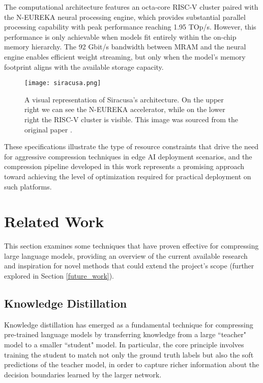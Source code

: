 The computational architecture features an octa-core RISC-V cluster paired with the N-EUREKA neural processing engine, which provides substantial parallel processing capability with peak performance reaching 1.95 TOp/s. However, this performance is only achievable when models fit entirely within the on-chip memory hierarchy. The 92 Gbit/s bandwidth between MRAM and the neural engine enables efficient weight streaming, but only when the model's memory footprint aligns with the available storage capacity.

\begin{figure}[htbp]
    \centering
    \texttt{[image: siracusa.png]}
    \caption[The architecture of Siracusa]{A visual representation of Siracusa's architecture. On the upper right we can see the N-EUREKA accelerator, while on the lower right the RISC-V cluster is visible. This image was sourced from the original paper \cite{target_hardware}.}
    \label{fig:siracusa}
\end{figure}

These specifications illustrate the type of resource constraints that drive the need for aggressive compression techniques in edge AI deployment scenarios, and the compression pipeline developed in this work represents a promising approach toward achieving the level of optimization required for practical deployment on such platforms.
\section{Related Work}

This section examines some techniques that have proven effective for compressing large language models, providing an overview of the current available research and inspiration for novel methods that could extend the project's scope (further explored in Section \ref{future_work}).

\subsection{Knowledge Distillation} \label{distillation_paragraph}

Knowledge distillation \cite{distillation} has emerged as a fundamental technique for compressing pre-trained language models by transferring knowledge from a large ``teacher" model to a smaller ``student" model. In particular, the core principle involves training the student to match not only the ground truth labels but also the soft predictions of the teacher model, in order to capture richer information about the decision boundaries learned by the larger network.

